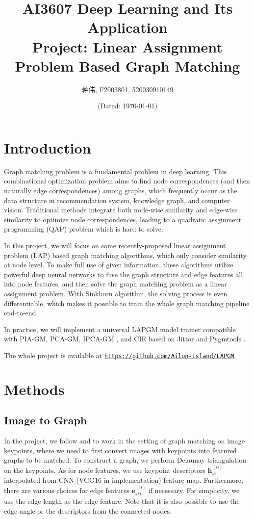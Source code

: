 \documentclass[a4paper]{article}
\title{AI3607 Deep Learning and Its Application\\Project: \textbf{L}inear \textbf{A}ssignment \textbf{P}roblem Based \textbf{G}raph \textbf{M}atching}
\author{\sffamily 蒋伟, F2003801, 520030910149}
\date{(Dated: \today)}
\begin{document}
\maketitle

\section{Introduction}
Graph matching problem is a fundamental problem in deep learning. This combinational optimization problem aims to find node correspondences (and then naturally edge correspondences) among graphs, which frequently occur as the data structure in recommendation system, knowledge graph, and computer vision. Traditional methods integrate both node-wise similarity and edge-wise similarity to optimize node correspondences, leading to a quadratic assginment programming (QAP) problem which is hard to solve. 

In this project, we will focus on some recently-proposed linear assignment problem (LAP) based graph matching algorithms, which only consider similarity at node level. To make full use of given information, these algorithms utilize powerful deep neural networks to fuse the graph structure and edge features all into node features, and then solve the graph matching problem as a linear assignment problem. With Sinkhorn \cite{sinkhorn} algorithm, the solving process is even differentiable, which makes it possible to train the whole graph matching pipeline end-to-end.

In practice, we will implement a universal LAPGM model trainer compatible with PIA-GM, PCA-GM, IPCA-GM \cite{pca-ipca}, and CIE \cite{cie} based on Jittor \cite{jittor} and Pygmtools \cite{pygmtools}. 

The whole project is available at \href{https://github.com/Ailon-Island/LAPGM}{\texttt{https://github.com/Ailon-Island/LAPGM}}.

\section{Methods}

\subsection{Image to Graph}
In the project, we follow \cite{pca-ipca} and \cite{cie} to work in the setting of graph matching on image keypoints, where we need to first convert images with keypoints into featured graphs to be matched. To construct a graph, we perform Delaunay triangulation \cite{delaunay} on the keypoints. As for node features, we use keypoint descriptors $\mathbf{h}_{si}^{(0)}$ interpolated from CNN (VGG16 \cite{vgg} in implementation) feature map. Furthermore, there are various choices for edge features $\mathbf{e}_{sij}^{(0)}$ if necessary. For simplicity, we use the edge length as the edge feature. Note that it is also possible to use the edge angle or the descriptors from the connected nodes.
\end{document}
